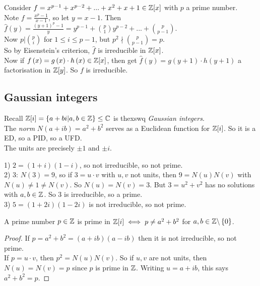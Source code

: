 \documentclass[a4paper]{article}
\begin{document}
\begin{eg}
Consider $f= x^{p-1} + x^{p-2}+...+x^2+x+1 \in \mathbb{Z}[x]$ with $p$ a prime number.\\
Note $f=\frac{x^p-1}{x-1}$, so let $y=x-1$. Then\\
$\hat{f}\left(y\right) = \frac{\left(y+1\right)^p-1}{y} = y^{p-1} + {p \choose 1} y^{p-2} + ... + {p \choose p-1}$.\\
Now $p | {p\choose i}$ for $1\leq i \leq p-1$, but $p^2 \nmid {p \choose p-1} = p$.\\
So by Eisenstein's criterion, $\hat{f}$ is irreducible in $\mathbb{Z}[x]$.\\
Now if $f\left(x\right)=g\left(x\right)\cdot h\left(x\right) \in \mathbb{Z}[x]$, then get $\hat{f}\left(y\right) = g\left(y+1\right)\cdot h\left(y+1\right)$ a factorisation in $\mathbb{Z}[y]$. So $f$ is irreducible.
\end{eg}

\subsection{Gaussian integers}
Recall $\mathbb{Z}[i] = \left\{a+bi | a,b\in\mathbb{Z}\right\} \leq \mathbb{C}$ is thexswq \emph{Gaussian integers}.\\
The \emph{norm} $N\left(a+ib\right)=a^2 + b^2$ serves as a Euclidean function for $\mathbb{Z}[i]$. So it is a ED, so a PID, so a UFD.\\
The units are precisely $\pm 1$ and $\pm i$.\\

\begin{eg}
1) $2=\left(1+i\right)\left(1-i\right)$, so not irreducible, so not prime.\\
2) $3$: $N\left(3\right)=9$, so if $3=u\cdot v$ with $u,v$ not units, then $9=N\left(u\right)N\left(v\right)$ with $N\left(u\right)\neq 1 \neq N\left(v\right)$. So $N\left(u\right)=N\left(v\right)=3$. But $3=u^2+v^2$ has no solutions with $a,b\in \mathbb{Z}$. So 3 is irreducible, so a prime.\\
3) $5=\left(1+2i\right)\left(1-2i\right)$ is not irreducible, so not prime.
\end{eg}

\begin{prop}
A prime number $p\in\mathbb{Z}$ is prime in $\mathbb{Z}[i] \iff p \neq a^2+b^2$ for $a,b\in\mathbb{Z}\backslash\left\{0\right\}$.
\begin{proof}
If $p=a^2+b^2=\left(a+ib\right)\left(a-ib\right)$ then it is not irreducible, so not prime.\\
If $p=u\cdot v$, then $p^2 = N\left(u\right)N\left(v\right)$. So if $u,v$ are not units, then $N\left(u\right)=N\left(v\right)=p$ since $p$ is prime in $\mathbb{Z}$. Writing $u=a+ib$, this says $a^2+b^2=p$.
\end{proof}
\end{prop}
\end{document}
